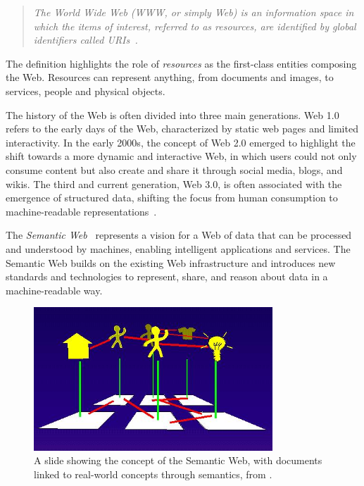 \begin{quote}
\emph{
The World Wide Web (WWW, or simply Web) is an information space in which the items of interest, referred to as resources, are identified by global identifiers called \acfp{URI}~\cite{wwwarch2004}.
}
\end{quote}

The definition highlights the role of \emph{resources} as the first-class entities composing the Web. 
%
Resources can represent anything, from documents and images, to services, people and physical objects. 

The history of the Web is often divided into three main generations.
%
Web 1.0 refers to the early days of the Web, characterized by static web pages and limited interactivity.
%
In the early 2000s, the concept of Web 2.0 emerged to highlight the shift towards a more dynamic and interactive Web, in which users could not only consume content but also create and share it through social media, blogs, and wikis.
%
The third and current generation, Web 3.0, is often associated with the emergence of structured data, shifting the focus from human consumption to machine-readable representations~\cite{Aghaei_2012}.

The \emph{Semantic Web}~\cite{berners2023semantic} represents a vision for a Web of data that can be processed and understood by machines, enabling intelligent applications and services.
%
The Semantic Web builds on the existing Web infrastructure and introduces new standards and technologies to represent, share, and reason about data in a machine-readable way. 

\begin{figure}[t]
    \centering
    \includegraphics[width=0.8\textwidth]{figures/semantic.jpg}
    \caption{A slide showing the concept of the Semantic Web, with documents linked to real-world concepts through semantics, from \cite{bernerslee1994www94plenary}.}
    \label{fig:semantic-web-idea}
\end{figure}

